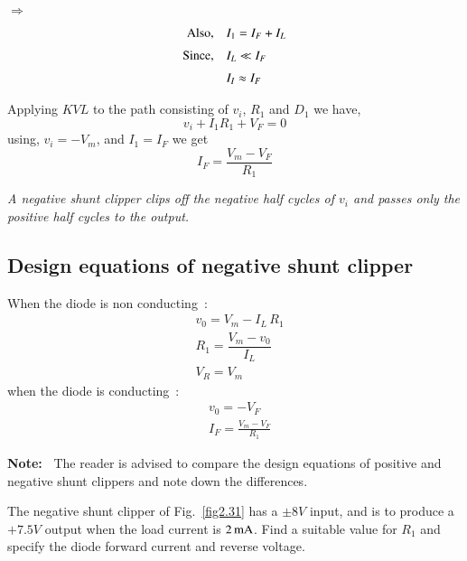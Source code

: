 $\Rightarrow$
\begin{align}
\text{Also,}\quad & I_{1}=I_{F}+I_{L}\label{eq2.115}\\[3pt]
\text{Since,}\quad & I_{L}\ll I_{F}\notag\\[3pt]
& I_{I}\approx I_{F}\label{eq2.116}
\end{align}

Applying $KVL$ to the path consisting of $v_{i}$, $R_{1}$ and $D_{1}$ we have,
\begin{equation}
v_{i}+I_{1}R_{1}+V_{F}=0\label{eq2.117}
\end{equation}
using, $v_{i}=-V_{m}$, and $I_{1}=I_{F}$ we get
\begin{equation}
I_{F}=\dfrac{V_{m}-V_{F}}{R_{1}}\label{eq2.118}
\end{equation}


{\em A negative shunt clipper clips off the negative half cycles of $v_{i}$ and passes only the positive half cycles to the output.}

\subsection{Design equations of negative shunt clipper}\label{sec2.31.4}

When the diode is non conducting~:
\begin{align}
& v_{0}=V_{m}-I_{L}\,R_{1}\label{eq2.119}\\
& R_{1}=\dfrac{V_{m}-v_{0}}{I_{L}}\label{eq2.120}\\
& V_{R}=V_{m}\label{eq2.121}
\end{align}
when the diode is conducting~:
\begin{align}
& v_{0} =-V_{F}\label{eq2.122}\\
& I_{F}=\frac{V_{m}-V_{F}}{R_{1}}\label{eq2.123}
\end{align}

\noindent
{\bf Note:~} The reader is advised to compare the design equations of positive and negative shunt clippers and note down the differences.

\begin{example}\label{exam2.40}
The negative shunt clipper of Fig.~\ref{fig2.31} has a $\pm 8V$ input, and is to produce a $+7.5V$ output when the load current is $2\operatorname{mA}$. Find a suitable value for $R_{1}$ and specify the diode forward current and reverse voltage.
\end{example}

